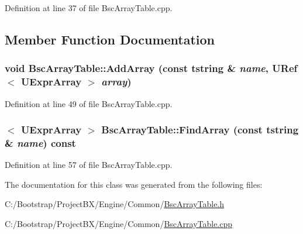 Definition at line 37 of file BscArrayTable.cpp.

\subsection{Member Function Documentation}
\hypertarget{class_bsc_array_table_38b2c7ac150c6ce1dab65c0a2387c0de}{
\subsubsection[{AddArray}]{\setlength{\rightskip}{0pt plus 5cm}void BscArrayTable::AddArray (const {\bf tstring} \& {\em name}, \/  {\bf URef}$<$ {\bf UExprArray} $>$ {\em array})}}
\label{class_bsc_array_table_38b2c7ac150c6ce1dab65c0a2387c0de}




Definition at line 49 of file BscArrayTable.cpp.\hypertarget{class_bsc_array_table_2d3220ea99c7cad6720dbb1395bfd879}{
\subsubsection[{FindArray}]{$<$ {\bf UExprArray} $>$ BscArrayTable::FindArray (const {\bf tstring} \& {\em name}) const}}
\label{class_bsc_array_table_2d3220ea99c7cad6720dbb1395bfd879}




Definition at line 57 of file BscArrayTable.cpp.

The documentation for this class was generated from the following files:\begin{CompactItemize}
\item 
C:/Bootstrap/ProjectBX/Engine/Common/\hyperlink{_bsc_array_table_8h}{BscArrayTable.h}\item 
C:/Bootstrap/ProjectBX/Engine/Common/\hyperlink{_bsc_array_table_8cpp}{BscArrayTable.cpp}\end{CompactItemize}
